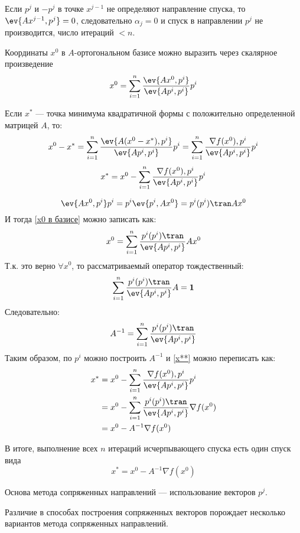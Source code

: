 \begin{remark}
    Если \(p^j\) и \(- p^j\) в точке \(x^{j - 1}\) не определяют направление спуска, то \(\ev{Ax^{j - 1}, p^j} = 0\), следовательно \(\alpha_j = 0\) и спуск в направлении \(p^j\) не производится, число итераций \(< n\).
\end{remark}

Координаты \(x^0\) в \(A\)-ортогональном базисе можно выразить через скалярное произведение
\begin{equation}
    x^0 = \sum_{i = 1}^n \frac{\ev{Ax^0, p^i}}{\ev{Ap^i, p^i}} p^i
    \label{x0 в базисе}
\end{equation}

Если \(x^*\) --- точка минимума квадратичной формы с положительно определенной матрицей \(A\), то:
\[x^0 - x^* = \sum_{i = 1}^n \frac{\ev{A(x^0 - x^*), p^i}}{\ev{Ap^i, p^i}} p^i = \sum_{i = 1}^n \frac{\nabla f(x^0), p^i}{\ev{Ap^i, p^i}} p^i\]
\begin{equation}
    x^* = x^0 - \sum_{i = 1}^n \frac{\nabla f(x^0), p^i}{\ev{Ap^i, p^i}} p^i
    \label{x**}
\end{equation}

\[\ev{Ax^0, p^i} p^i = p^i \ev{p^i, Ax^0} = p^i (p^i)\tran Ax^0\]
И тогда \eqref{x0 в базисе} можно записать как:
\[x^0 = \sum_{i = 1}^n \frac{p^i (p^i)\tran }{\ev{Ap^i, p^i}} Ax^0\]
Т.к. это верно \(\forall x^0\), то рассматриваемый оператор тождественный:
\[\sum_{i = 1}^n \frac{p^i (p^i)\tran }{\ev{Ap^i, p^i}} A = \mathbf{1}\]
Следовательно:
\[A^{ - 1} = \sum_{i = 1}^n \frac{p^i (p^i)\tran }{\ev{Ap^i, p^i}}\]
Таким образом, по \(p^i\) можно построить \(A^{ - 1}\) и \eqref{x**} можно переписать как:
\begin{align*}
    x^*
     & = x^0 - \sum_{i = 1}^n \frac{\nabla f(x^0), p^i}{\ev{Ap^i, p^i}} p^i        \\
     & = x^0 - \sum_{i = 1}^n \frac{p^i (p^i)\tran }{\ev{Ap^i, p^i}} \nabla f(x^0) \\
     & = x^0 - A^{ - 1} \nabla f(x^0)                                              \\
\end{align*}

В итоге, выполнение всех \(n\) итераций исчерпывающего спуска есть один спуск вида
\[x^* = x^0 - A^{ - 1} \nabla f(x^0)\]

Основа метода сопряженных направлений --- использование векторов \(p^j\).

Различие в способах построения сопряженных векторов порождает несколько вариантов метода сопряженных направлений.

